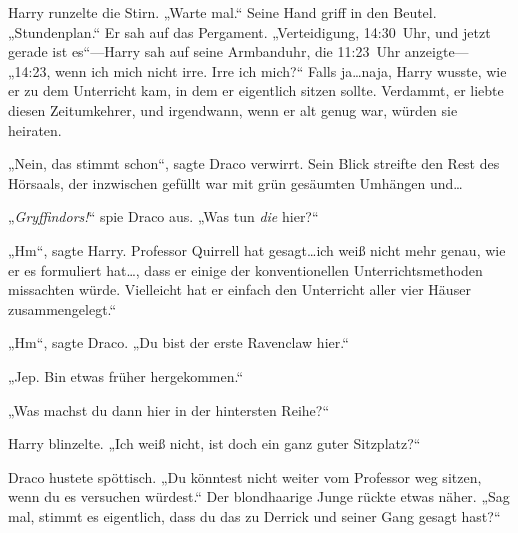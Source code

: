 Harry runzelte die Stirn. „Warte mal.“ Seine Hand griff in den Beutel. „Stundenplan.“ Er sah auf das Pergament. „Verteidigung, 14:30~Uhr, und jetzt gerade ist es“—Harry sah auf seine Armbanduhr, die 11:23~Uhr anzeigte— „14:23, wenn ich mich nicht irre. Irre ich mich?“ Falls ja…naja, Harry wusste, wie er zu dem Unterricht kam, in dem er eigentlich sitzen sollte. Verdammt, er liebte diesen Zeitumkehrer, und irgendwann, wenn er alt genug war, würden sie heiraten.

„Nein, das stimmt schon“, sagte Draco verwirrt. Sein Blick streifte den Rest des Hörsaals, der inzwischen gefüllt war mit grün gesäumten Umhängen und…

„\emph{Gryffindors!}“ spie Draco aus. „Was tun \emph{die} hier?“

„Hm“, sagte Harry. Professor Quirrell hat gesagt…ich weiß nicht mehr genau, wie er es formuliert hat…, dass er einige der konventionellen Unterrichtsmethoden missachten würde. Vielleicht hat er einfach den Unterricht aller vier Häuser zusammengelegt.“

„Hm“, sagte Draco. „Du bist der erste Ravenclaw hier.“

„Jep. Bin etwas früher hergekommen.“

„Was machst du dann hier in der hintersten Reihe?“

Harry blinzelte. „Ich weiß nicht, ist doch ein ganz guter Sitzplatz?“

Draco hustete spöttisch. „Du könntest nicht weiter vom Professor weg sitzen, wenn du es versuchen würdest.“ Der blondhaarige Junge rückte etwas näher. „Sag mal, stimmt es eigentlich, dass du das zu Derrick und seiner Gang gesagt hast?“

